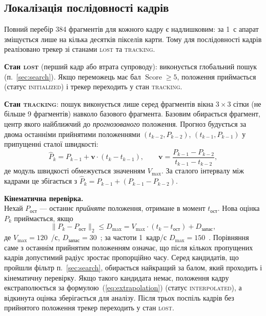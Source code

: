 \subsection{Локалізація послідовності кадрів}
\label{sec:tracking}

Повний перебір 384 фрагментів для кожного кадру є надлишковим: за 1~с апарат зміщується лише на кілька десятків пікселів карти. Тому для послідовності кадрів реалізовано трекер зі станами \textsc{lost} та \textsc{tracking}.

\textbf{Стан \textsc{lost}} (перший кадр або втрата супроводу): виконується глобальний пошук (п.~\ref{sec:search}). Якщо переможець має бал $\operatorname{Score} \ge 5$, положення приймається (статус \textsc{initialized}) і трекер переходить у стан \textsc{tracking}.

\textbf{Стан \textsc{tracking}}: пошук виконується лише серед фрагментів вікна $3 \times 3$ сітки (не більше 9 фрагментів) навколо базового фрагмента. Базовим обирається фрагмент, центр якого найближчий до \emph{прогнозованого} положення. Прогноз будується за двома останніми прийнятими положеннями $(t_{k-2}, P_{k-2})$, $(t_{k-1}, P_{k-1})$ у припущенні сталої швидкості:
\begin{equation}
\hat{P}_k = P_{k-1} + \mathbf{v} \cdot (t_k - t_{k-1}), \qquad
\mathbf{v} = \frac{P_{k-1} - P_{k-2}}{t_{k-1} - t_{k-2}},
\label{eq:extrapolation}
\end{equation}
де модуль швидкості обмежується значенням $V_{\max}$. За сталого інтервалу між кадрами це збігається з $\hat{P}_k = P_{k-1} + (P_{k-1} - P_{k-2})$.

\textbf{Кінематична перевірка.}\\
Нехай $P_{\text{ост}}$ --- останнє \emph{прийняте} положення, отримане в момент $t_{\text{ост}}$. Нова оцінка $P_k$ приймається, якщо
\begin{equation}
\| P_k - P_{\text{ост}} \|_2 \le D_{\max} = V_{\max} \cdot (t_k - t_{\text{ост}}) + D_{\text{запас}},
\end{equation}
де $V_{\max} = 120$~\px{}/с, $D_{\text{запас}} = 30$~\px{}; за частоти 1~кадр/с $D_{\max} = 150$~\px{}. Порівняння саме з останнім прийнятим положенням означає, що після кількох пропущених кадрів допустимий радіус зростає пропорційно часу. Серед кандидатів, що пройшли фільтр п.~\ref{sec:search}, обирається найкращий за балом, який проходить і кінематичну перевірку. Якщо такого кандидата немає, положення кадру екстраполюється за формулою~(\ref{eq:extrapolation}) (статус \textsc{interpolated}), а відкинута оцінка зберігається для аналізу. Після трьох поспіль кадрів без прийнятого положення трекер переходить у стан \textsc{lost}.

